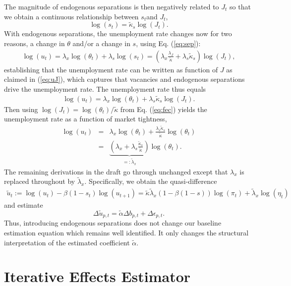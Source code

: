 \documentclass[12pt]{article}
\newcommand{\1}{\mathbf{1}}
\newcommand{\beq}{\begin{eqnarray}}
\newcommand{\eeq}{\end{eqnarray}}
\begin{document}
\begin{appendix}
The magnitude of endogenous separations is then negatively related to $J_t$ so that  we obtain a continuous relationship between $s_t$and $J_t$,
\begin{equation}\label{eq:sep}
\log(s_t)=\tilde{\kappa}_s \log(J_t).
\end{equation}
With endogenous separations, the unemployment rate changes now for two reasons, a change in $\theta$ and/or a change in $s$, using Eq. (\ref{eq:sep}):
 \beq\label{eq:decomp}
\log(u_t) = \lambda_x \log(\theta_t) + \lambda_s \log(s_t) = (\lambda_x \frac{\lambda_J}{\tilde{\kappa}} + \lambda_s \tilde{\kappa}_s ) \log(J_t),
\eeq
establishing that the unemployment rate can be written as function of $J$ as claimed in (\ref{eq:uJ}), which captures that vacancies and endogenous separations drive the unemployment rate. 
The unemployment rate thus equals
 \beq
\log(u_t) =  \lambda_x \log(\theta_t) +  \lambda_s \tilde{\kappa}_s  \log(J_t).
\eeq
Then using $\log(J_t) = \log(\theta_t) / \tilde{\kappa}$ from Eq. (\ref{eq:fec}) yields the unemployment rate as a function of market tightness,
\beq
\log(u_t) &  = &  \lambda_x \log(\theta_t) +  \frac{\lambda_s \tilde{\kappa}_s}{\tilde{\kappa}} \log(\theta_t) \\
	       & =&  \underbrace{(\lambda_x  + \lambda_s \frac{\tilde{\kappa}_s}{\tilde{\kappa}} )}_{=: \tilde{\lambda}_x }      \log(\theta_t).
\eeq
The remaining derivations in the draft go through unchanged except that $\lambda_x$ is replaced throughout by $\tilde{\lambda}_x$. Specifically, we obtain the quasi-difference
\beq
\tilde{u}_t := \log(u_t) - \beta (1-s_t) \log(u_{t+1}) = \tilde{\kappa} \tilde{\lambda}_x (1-\beta (1-s)) \log(\pi_{t}) + \tilde{\lambda}_x \log(\eta_t)
\eeq
and estimate
\begin{equation}
\Delta \tilde{u}_{p,t} = \tilde{\alpha} \Delta b_{p,t}+\Delta\epsilon_{p,t}.
\end{equation}
Thus, introducing endogenous separations does not change our baseline estimation equation which remains well identified. It only changes the structural interpretation of the estimated coefficient $\tilde{\alpha}$.


\clearpage
\section{Iterative Effects Estimator}
\label{app:implementation}


\end{appendix}
\end{document}
